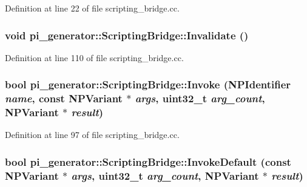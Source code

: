 Definition at line 22 of file scripting\_\-bridge.cc.

\hypertarget{classpi__generator_1_1_scripting_bridge_a581ae88aa4acbefc30ae563452ab2fd5}{
\subsubsection[{Invalidate}]{\setlength{\rightskip}{0pt plus 5cm}void pi\_\-generator::ScriptingBridge::Invalidate ()}}
\label{classpi__generator_1_1_scripting_bridge_a581ae88aa4acbefc30ae563452ab2fd5}


Definition at line 110 of file scripting\_\-bridge.cc.

\hypertarget{classpi__generator_1_1_scripting_bridge_a3518781037308ae1d63bcdf5cc77a3de}{
\subsubsection[{Invoke}]{\setlength{\rightskip}{0pt plus 5cm}bool pi\_\-generator::ScriptingBridge::Invoke ({\bf NPIdentifier} {\em name}, \/  const {\bf NPVariant} $\ast$ {\em args}, \/  uint32\_\-t {\em arg\_\-count}, \/  {\bf NPVariant} $\ast$ {\em result})}}
\label{classpi__generator_1_1_scripting_bridge_a3518781037308ae1d63bcdf5cc77a3de}


Definition at line 97 of file scripting\_\-bridge.cc.

\hypertarget{classpi__generator_1_1_scripting_bridge_a0589fe559ec8b9297e37239233e238be}{
\subsubsection[{InvokeDefault}]{\setlength{\rightskip}{0pt plus 5cm}bool pi\_\-generator::ScriptingBridge::InvokeDefault (const {\bf NPVariant} $\ast$ {\em args}, \/  uint32\_\-t {\em arg\_\-count}, \/  {\bf NPVariant} $\ast$ {\em result})}}
\label{classpi__generator_1_1_scripting_bridge_a0589fe559ec8b9297e37239233e238be}


